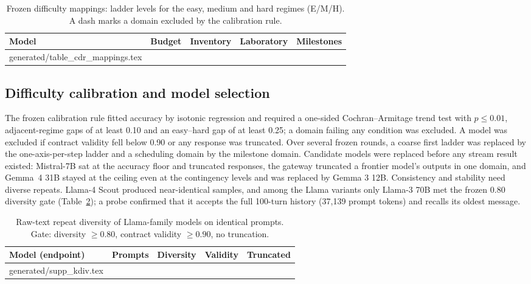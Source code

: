 \documentclass[10pt]{article}
\makeatletter
\newcommand{\inputtable}[1]{\@@input #1 }
\makeatother
\begin{document}
\begin{table}[h]\centering\small
\caption{Frozen difficulty mappings: ladder levels for the easy, medium and
hard regimes (E/M/H). A dash marks a domain excluded by the calibration rule.}
\label{tab:s2map}
\begin{tabular}{lcccc}\toprule
Model & Budget & Inventory & Laboratory & Milestones\\\midrule
\inputtable{generated/table_cdr_mappings.tex}
\bottomrule\end{tabular}\end{table}

\subsection{Difficulty calibration and model selection}
\label{sec:s2-calibration}
The frozen calibration rule fitted accuracy by isotonic regression and required
a one-sided Cochran--Armitage trend test with $p\le0.01$, adjacent-regime gaps of
at least 0.10 and an easy--hard gap of at least 0.25; a domain failing any
condition was excluded. A model was excluded if contract validity fell below
0.90 or any response was truncated. Over several frozen rounds, a coarse first
ladder was replaced by the one-axis-per-step ladder and a scheduling domain by
the milestone domain. Candidate models were replaced before any stream result
existed: Mistral-7B sat at the accuracy floor and truncated responses, the
gateway truncated a frontier model's outputs in one domain, and Gemma~4 31B
stayed at the ceiling even at the contingency levels and was replaced by Gemma
3 12B. Consistency and stability need diverse repeats. Llama-4 Scout produced
near-identical samples, and among the Llama variants only Llama-3 70B met the
frozen 0.80 diversity gate (Table~\ref{tab:kdiv}); a probe confirmed that it
accepts the full 100-turn history (37,139 prompt tokens) and recalls its oldest
message.

\begin{table}[h]\centering\small
\caption{Raw-text repeat diversity of Llama-family models on identical prompts.
Gate: diversity $\ge0.80$, contract validity $\ge0.90$, no truncation.}
\label{tab:kdiv}
\begin{tabular}{llccc}\toprule
Model (endpoint) & Prompts & Diversity & Validity & Truncated\\\midrule
\inputtable{generated/supp_kdiv.tex}
\bottomrule\end{tabular}\end{table}
\end{document}
